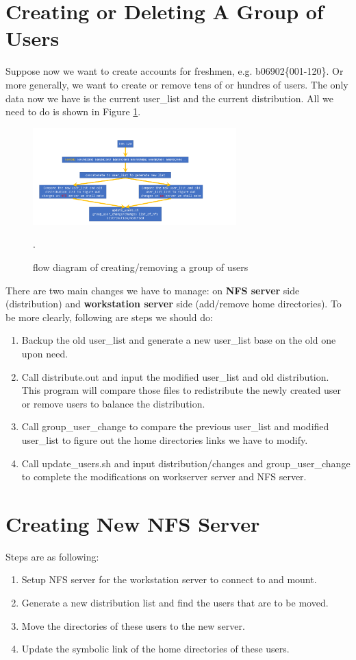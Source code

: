 \documentclass{article}
\begin{document}
\section{Creating or Deleting A Group of Users}
Suppose now we want to create accounts for freshmen, e.g. b06902\{001-120\}. 
Or more generally, we want to create or remove tens of or hundres of users.
The only data now we have is the current user\_list and the current distribution.
All we need to do is shown in Figure \ref{userChange}.
\begin{figure}[h]
\centering
\includegraphics[width=0.7\textwidth]{Fig2.png}
\caption{flow diagram of creating/removing a group of users}
\label{userChange}.
\end{figure}
There are two main changes we have to manage: on {\bf NFS server} side (distribution) and {\bf workstation server} side
(add/remove home directories). To be more clearly, following are steps we should do:
   \begin{enumerate}
   \item Backup the old user\_list and generate a new user\_list base on the old one upon need.
   \item Call {\cs distribute.out} and input the modified user\_list and old distribution.
   This program will compare those files to redistribute the newly created user or remove users to balance the distribution.
   \item Call {\cs group\_user\_change} to compare the previous user\_list and modified user\_list to figure out
   the home directories links we have to modify.
   \item Call {\cs update\_users.sh} and input distribution/changes and group\_user\_change to complete the modifications on workserver server and NFS server.
   \end{enumerate}

\section{Creating New NFS Server}
Steps are as following:
   \begin{enumerate}
   \item Setup NFS server for the workstation server to connect to and mount.
   \item Generate a new distribution list and find the users that are to be moved.
   \item Move the directories of these users to the new server.
   \item Update the symbolic link of the home directories of these users.
   \end{enumerate}
\end{document}
